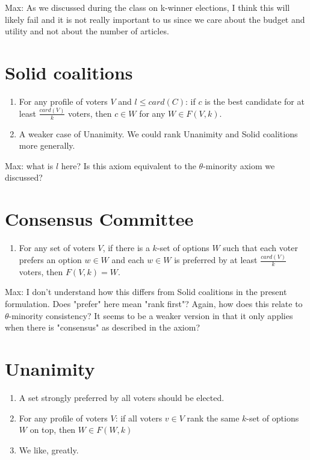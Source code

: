 \documentclass{article}
\begin{document}
Max: {As we discussed during the class on k-winner elections, I think this will likely fail and it is not really important to us since we care about the budget and utility and not about the number of articles.}

\section{Solid coalitions}
\begin{enumerate}
\item For any profile of voters $V$ and $l \leq card(C)$: if $c$ is the best candidate for at least $\frac{card(V)}{k}$ voters, then $c \in W$ for any $W \in F(V, k)$.
\item A weaker case of Unanimity. We could rank Unanimity and Solid coalitions more generally.

\end{enumerate}

Max: {what is $l$ here? Is this axiom equivalent to the $\theta$-minority axiom we discussed?}

\section{Consensus Committee}
\begin{enumerate}
\item For any set of voters $V$, if there is a $k$-set of options $W$ such that each voter prefers an option $w \in W$ and each $w \in W$ is preferred by at least $\frac{card(V)}{k}$ voters, then $F(V, k) = W$.

\end{enumerate}

Max: {I don't understand how this differs from Solid coalitions in the present formulation. Does "prefer" here mean "rank first"? Again, how does this relate to $\theta$-minority consistency? It seems to be a weaker version in that it only applies when there is "consensus" as described in the axiom?}

\section{Unanimity}
\begin{enumerate}
\item A set strongly preferred by all voters should be elected.
\item For any profile of voters $V$: if all voters $v \in V$ rank the same $k$-set of options $W$ on top, then $W \in F(W, k)$
\item We like, greatly.

\end{enumerate}
\end{document}
